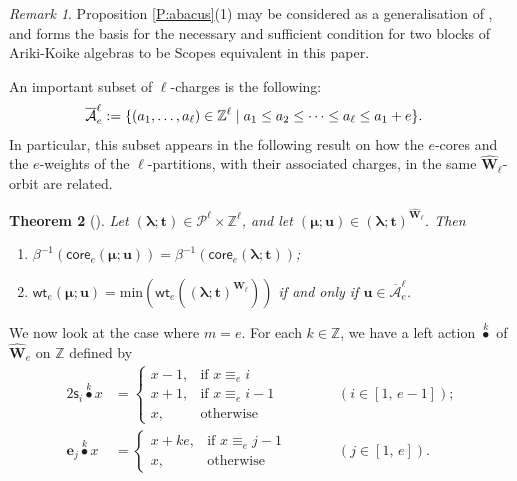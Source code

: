 \documentclass[11pt,a4paper,reqno]{amsart}
\numberwithin{equation}{section}
\theoremstyle{plain}
\newtheorem{thm}{Theorem}[section]
\theoremstyle{definition}
\theoremstyle{remark}
\newtheorem{rem}[thm]{Remark}
\numberwithin{equation}{section}
\newcommand{\bl}{\boldsymbol{\lambda}}
\newcommand{\bm}{\boldsymbol{\mu}}
\newcommand{\bt}{\mathbf{t}}
\newcommand{\bu}{\mathbf{u}}
\newcommand{\wt}{\mathsf{wt}}
\newcommand{\core}{\mathsf{core}}
\renewcommand{\min}{\mathrm{min}}
\newcommand{\ZZ}{\mathbb{Z}}
\newcommand{\cs}{\mathsf{s}}
\newcommand{\rr}{\rho}
\newcommand{\PP}{\mathcal{P}}
\newcommand{\Be}{\mathbf{e}}
\newcommand{\EW}{\widehat{\mathbf{W}}}
\newcommand{\DDot}[1]{\mathrel{\overset{#1}{\bullet}}}
\newcommand{\AAF}{\mathcal{A_\mathsf{F}}}
\newcommand{\AAbar}{\overline{\mathcal{A}}_e^{\ell}}
\def\Z{{\mathbb Z}}
\begin{document}
\begin{rem}
  Proposition \ref{P:abacus}(1) may be considered as a generalisation of \cite[Lemma 4.2]{LQT}, and forms the basis for the necessary and sufficient condition for two blocks of Ariki-Koike algebras to be Scopes equivalent in this paper.
\end{rem}


An important subset of $\ell$-charges is the following:
\begin{align*}
\index{$\AAbar$} \AAbar &:= \{ (a_1,\dotsc, a_{\ell}) \in \ZZ^{\ell} \mid a_1 \leq a_2 \leq \dotsb \leq a_{\ell} \leq a_1 + e \}.
\end{align*}
In particular, this subset appears in the following result on how the $e$-cores and the $e$-weights of the $\ell$-partitions, with their associated charges, in the same $\EW_{\ell}$-orbit are related.

\begin{thm}[{\cite[Theorem 3.6]{LT}}] \label{T:core-n-weight}
Let $(\bl;\bt) \in \PP^{\ell} \times \ZZ^{\ell}$, and let $(\bm;\bu) \in (\bl;\bt)^{\EW_{\ell}}$.  Then
\begin{enumerate}
  \item $\beta^{-1}(\core_e(\bm;\bu)) = \beta^{-1}(\core_e(\bl;\bt))$;
 \item $\wt_e(\bm;\bu) = \min( \wt_e( (\bl;\bt)^{\EW_{\ell}} ) )$ if and only if $\bu \in \AAbar$.
\end{enumerate}
\end{thm}


We now look at the case where $m = e$.
For each $k \in \ZZ$, we have a left action $\DDot{k}$ of $\EW_e$ on $\Z$ defined by
\begin{alignat*}{2}
\cs_i \DDot{k} x &=
\begin{cases}
x-1, &\text{if } x \equiv_e i \\
x+1, &\text{if } x \equiv_e i-1 \\
x, &\text{otherwise}
\end{cases}
&\qquad & (i \in [ 1,\, e-1]); \\
\Be_j \DDot{k} x &=
\begin{cases}
x+k e, &\text{if } x \equiv_e j-1 \\
x, &\text{otherwise}
\end{cases}
&& (j \in [1,\, e]).
\end{alignat*}
\end{document}
